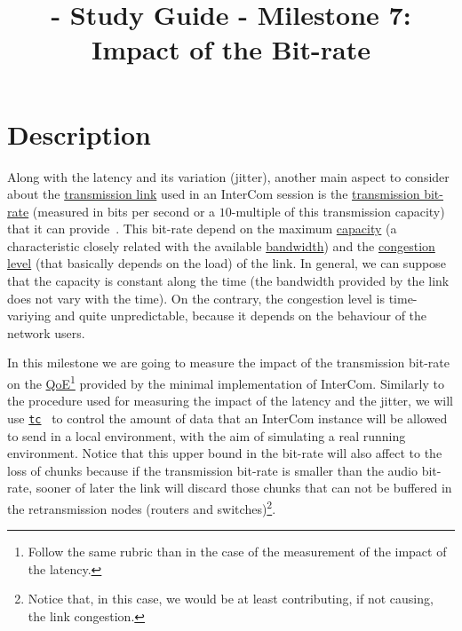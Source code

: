 
\title{\TM{} - Study Guide - Milestone 7: Impact of the Bit-rate}

\maketitle

\section{Description}

Along with the latency and its variation (jitter), another main aspect
to consider about the
\href{https://en.wikipedia.org/wiki/Telecommunications_link}{transmission
  link} used in an InterCom session is the
\href{https://en.wikipedia.org/wiki/Bit_rate}{transmission bit-rate}
(measured in bits per second or a $10$-multiple of this transmission
capacity) that it can provide~\cite{Forouzan,Tanenbaum}. This bit-rate
depend on the maximum
\href{https://en.wikipedia.org/wiki/Bandwidth_(computing)}{capacity}
(a characteristic closely related with the available
\href{https://en.wikipedia.org/wiki/Bandwidth_(signal_processing)}{bandwidth})
and the
\href{https://en.wikipedia.org/wiki/Network_congestion}{congestion
  level} (that basically depends on the load) of the link. In general,
we can suppose that the capacity is constant along the time (the
bandwidth provided by the link does not vary with the time). On the
contrary, the congestion level is time-variying and quite
unpredictable, because it depends on the behaviour of the network
users.

In this milestone we are going to measure the impact of the
transmission bit-rate on the
\href{https://en.wikipedia.org/wiki/Quality_of_experience}{QoE}\footnote{Follow
  the same rubric than in the case of the measurement of the impact of
  the latency.} provided by the minimal implementation of InterCom. Similarly to the procedure used for measuring the impact of
the latency and the jitter, we will use
\href{https://man7.org/linux/man-pages/man8/tc.8.html}{\texttt{tc}}~\cite{bert2012lartc}
to control the amount of data that an InterCom instance will be
allowed to send in a local environment, with the aim of simulating a
real running environment. Notice that this upper bound in the bit-rate
will also affect to the loss of chunks because if the transmission
bit-rate is smaller than the audio bit-rate, sooner of later the link
will discard those chunks that can not be buffered in the retransmission
nodes (routers and switches)\footnote{Notice that, in this case, we
would be at least contributing, if not causing, the link congestion.}.

